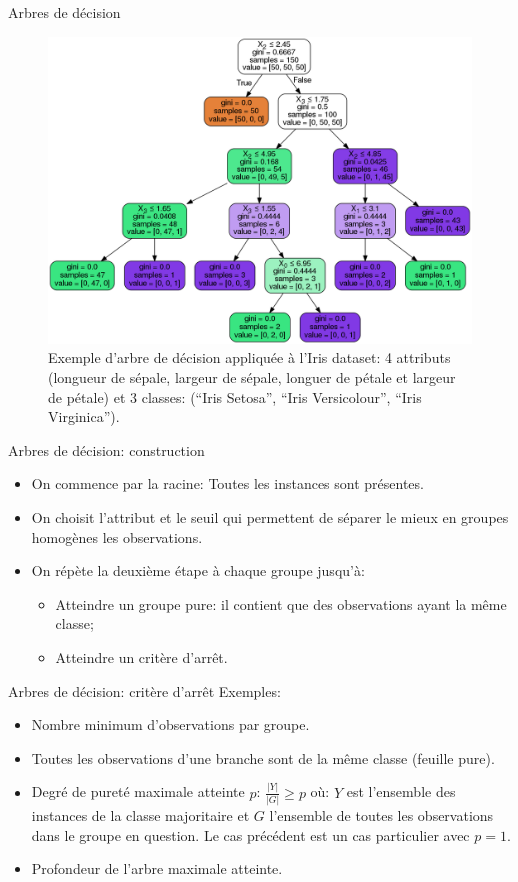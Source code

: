 \documentclass[8pt]{beamer}
\begin{document}
			\begin{frame}{Arbres de décision}
				\begin{figure}[H]
					\includegraphics[width=.65\textwidth]{images/samples/example_dt_iris_dataset.png}
					\caption*{Exemple d'arbre de décision appliquée à l'Iris dataset: 4 attributs (longueur de sépale, largeur de sépale, longuer de pétale et largeur de pétale) et 3 classes: (``Iris Setosa'', ``Iris Versicolour'', ``Iris Virginica'').}
				\end{figure}
			\end{frame}
			\begin{frame}{Arbres de décision: construction}
				\begin{itemize}
					\item<1-> On commence par la racine: Toutes les instances sont présentes.
					\item<2-> On choisit l'attribut et le seuil qui permettent de séparer le mieux en groupes homogènes les observations.
					\item<3-> On répète la deuxième étape à chaque groupe jusqu'à:
						\begin{itemize}
							\item<4-> Atteindre un groupe pure: il contient que des observations ayant la même classe;
							\item<5-> Atteindre un critère d'arrêt.
						\end{itemize}
				\end{itemize}
			\end{frame}
			\begin{frame}{Arbres de décision: critère d'arrêt}
				Exemples:
				\begin{itemize}
					\item<1-> Nombre minimum d’observations par groupe.
					\item<2-> Toutes les observations d’une branche sont de la même classe (feuille pure).
					\item<3-> Degré de pureté maximale atteinte \(p\): \(\frac{\vert Y \vert}{\vert G\vert} \geq p\) où: \(Y\) est l'ensemble des instances de la classe majoritaire et \(G\) l'ensemble de toutes les observations dans le groupe en question. Le cas précédent est un cas particulier avec \(p = 1\).
					\item<4-> Profondeur de l’arbre maximale atteinte.
				\end{itemize}
			\end{frame}
\end{document}
